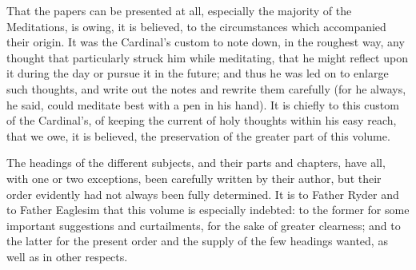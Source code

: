 That the papers can
be presented at all, especially the majority of the Meditations, is
owing, it is believed, to the circumstances which accompanied their
origin. It was the Cardinal's custom to note down, in the roughest
way, any thought that particularly struck him while meditating, that he
might reflect upon it during the day or pursue it in the future; and thus he was led on to enlarge such thoughts, and write out the notes
and rewrite them carefully (for he always, he said, could meditate best
with a pen in his hand). It is chiefly to this custom of the
Cardinal's, of keeping the current of holy thoughts within his easy
reach, that we owe, it is believed, the preservation of the greater part
of this volume.


The headings of the
different subjects, and their parts and chapters, have all, with one or
two exceptions, been carefully written by their author, but their order
evidently had not always been fully determined. It is to Father Ryder
and to Father Eaglesim that this volume is especially indebted: to the
former for some important suggestions and curtailments, for the sake of
greater clearness; and to the latter for the present order and the
supply of the few headings wanted, as well as in other respects.


